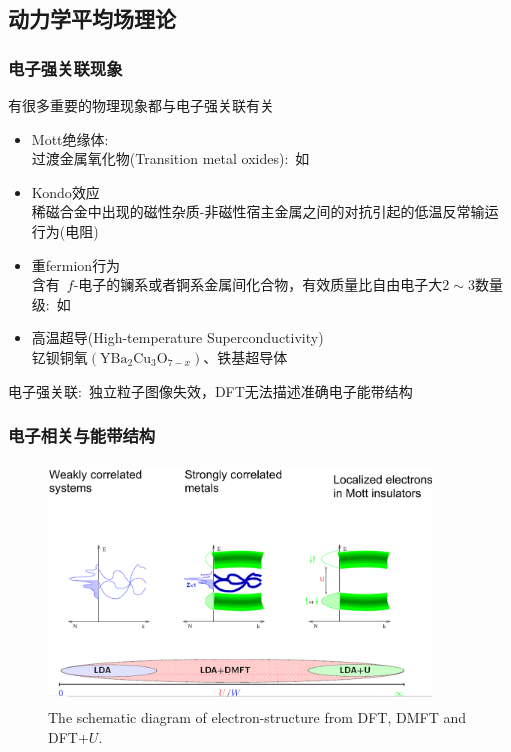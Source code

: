 \subsection{动力学平均场理论}
\frame
{
	\frametitle{电子强关联现象}
	有很多重要的物理现象都与电子强关联有关
	\begin{itemize}
		\item \textrm{Mott}绝缘体:\\
			过渡金属氧化物\textrm{(Transition metal oxides)}:~如~\textrm{}
		\item \textrm{Kondo}效应\\
			稀磁合金中出现的磁性杂质-非磁性宿主金属之间的对抗引起的低温反常输运行为(电阻)
		\item 重\textrm{fermion}行为\\
			含有~$f$-电子的镧系或者锕系金属间化合物，有效质量比自由电子大$2\sim3$数量级:~如~\textrm{}
		\item 高温超导\textrm{(High-temperature Superconductivity)}\\
			钇钡铜氧$(\mathrm{YBa}_2\mathrm{Cu}_3\mathrm{O}_{7-x})$、铁基超导体
	\end{itemize}
	电子强关联:~独立粒子图像失效，\textrm{DFT}无法描述准确电子能带结构
}

\frame
{
	\frametitle{电子相关与能带结构}
\begin{figure}[h!]
\centering
\vspace{-12pt}
\includegraphics[height=2.5in,width=4.00in,viewport=0 0 1680 1000,clip]{Figures/DFT-DMFT-compare.png}
\caption{\textrm{\tiny The schematic diagram of electron-structure from DFT, DMFT and DFT+$U$.}}%
\label{DFT-DMFT-Hubbard}
\end{figure}
}

